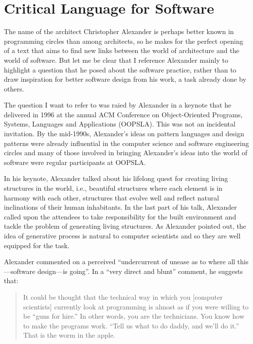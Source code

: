 \chapter*{Critical Language for Software}

The name of the architect Christopher Alexander is perhaps better known in programming
circles than among architects, so he makes for the perfect opening of a text that aims
to find new links between the world of architecture and the world of software. But let
me be clear that I reference Alexander mainly to highlight a question that he posed about
the software practice, rather than to draw inspiration for better software design from his
work, a task already done by others.

The question I want to refer to was raied by Alexander in a keynote that he delivered in
1996 at the annual ACM Conference on Object-Oriented Programs, Systems, Languages and
Applications (OOPSLA). This was not an incidental invitation. By the mid-1990s, Alexander's ideas
on pattern languages and design patterns were already influential in the computer science and
software engineering circles and many of those involved in bringing Alexander's ideas into the
world of software were regular participants at OOPSLA.

In his keynote, Alexander talked about his lifelong quest for creating living structures
in the world, i.e., beautiful structures where each element is in harmony with each other,
structures that evolve well and reflect natural inclinations of their human inhabitants.
In the last part of his talk, Alexander called upon the attendees to take responsibility
for the built environment and tackle the problem of generating living structures.
As Alexander pointed out, the idea of generative process is natural to computer scientists
and so they are well equipped for the task.

Alexander commented on a perceived ``undercurrent of unease as to where all
this---software design---is going''. In a ``very direct and blunt'' comment, he suggests that:

\begin{quote}
It could be thought that the technical way in which you [computer scientists] currently look at
programming is almost as if you were willing to be ``guns for hire.'' In other words, you are the
technicians. You know how to make the programs work. ``Tell us what to do daddy, and we'll do it.''
That is the worm in the apple.
\end{quote}

